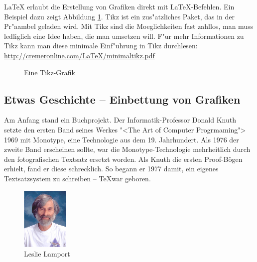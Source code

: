 \documentclass[11pt, a4paper,draft]{article}
\newcommand{\ltx}{\LaTeX}
\begin{document}
\ltx{} erlaubt die Erstellung von Grafiken direkt mit \ltx-Befehlen. Ein Beispiel dazu zeigt Abbildung \ref{fig:tikz}. Tikz ist ein zus"atzliches Paket, das in der Pr"aambel geladen wird.
Mit Tikz sind die Moeglichkeiten fast zahllos, man muss ledliglich eine Idee haben, die man umsetzen will. F"ur mehr Informationen zu Tikz kann man diese minimale Einf"uhrung in Tikz durchlesen:
\url{http://cremeronline.com/LaTeX/minimaltikz.pdf}
%
\begin{figure}[t]
\centering
{}
\caption{Eine Tikz-Grafik\label{fig:tikz}}
\end{figure}


\subsection{Etwas Geschichte -- Einbettung von Grafiken}
Am Anfang stand ein Buchprojekt. Der Informatik-Professor Donald Knuth setzte den ersten Band seines Werkes "<The Art of Computer Progrmaming"> 1969 mit Monotype, eine Technologie aus dem 19. Jahrhundert. Als 1976 der zweite Band erscheinen sollte, war die Monotype-Technologie mehrheitlich durch den fotografischen Textsatz ersetzt worden. Als Knuth die ersten Proof-Bögen erhielt, fand er diese schrecklich. So begann er 1977 damit, ein eigenes Textsatzsystem zu schreiben -- \TeX war geboren.

\begin{figure}[htb]
\centering
\includegraphics[width=0.2\textwidth]{Leslie_Lamportd}
\caption{Leslie Lamport\label{fig:LL}}
\end{figure}
\end{document}
